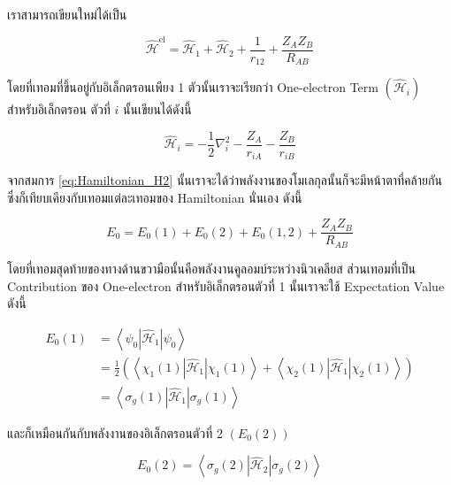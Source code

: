\noindent เราสามารถเขียนใหม่ได้เป็น

\begin{equation}
    \label{eq:Hamiltonian_H2_simple}
    \hat{\mathscr{H}}^{\mathrm{el}}
    =
    \hat{\mathscr{H}}_1
    + \hat{\mathscr{H}}_2
    + \frac{1}{r_{12}}
    + \frac{Z_A Z_B}{R_{A B}}
\end{equation}

\noindent โดยที่เทอมที่ขึ้นอยู่กับอิเล็กตรอนเพียง 1 ตัวนั้นเราจะเรียกว่า One-electron Term $(\hat{\mathscr{H}}_i)$ สำหรับอิเล็กตรอน%
ตัวที่ $i$ นั้นเขียนได้ดังนี้

\begin{equation}
    \hat{\mathscr{H}}_i
    =
    -\frac{1}{2} \nabla_i^2
    -\frac{Z_A}{r_{i A}}
    -\frac{Z_B}{r_{i B}}
\end{equation}

จากสมการ \ref{eq:Hamiltonian_H2} นั้นเราจะได้ว่าพลังงานของโมเลกุลนั้นก็จะมีหน้าตาที่คล้ายกันซึ่งก็เทียบเคียงกับเทอมแต่ละเทอมของ
Hamiltonian นั่นเอง ดังนี้

\begin{equation}
    \label{eq:Energy_hydrogen_molecule}
    E_0 = E_0(1) + E_0(2) + E_0(1,2) + \frac{Z_A Z_B}{R_{A B}}
\end{equation}

\noindent โดยที่เทอมสุดท้ายของทางด้านขวามือนั้นคือพลังงานคูลอมบ์ระหว่างนิวเคลียส ส่วนเทอมที่เป็น Contribution ของ One-electron
สำหรับอิเล็กตรอนตัวที่ 1 นั้นเราจะใช้ Expectation Value ดังนี้

\begin{equation}
    \begin{aligned}
        E_0(1)
         & = \left\langle\psi_0\left|\hat{\mathscr{H}}_1\right| \psi_0\right\rangle \\
         & = \frac{1}{2}
        \left(
        \left\langle
        \chi_1(1)\left|\hat{\mathscr{H}}_1\right| \chi_1(1)
        \right\rangle
        + \left\langle
        \chi_2(1)\left|\hat{\mathscr{H}}_1\right| \chi_2(1)
        \right\rangle
        \right)                                                                     \\
         & = \left\langle
        \sigma_g(1)\left|\hat{\mathscr{H}}_1\right| \sigma_g(1)
        \right\rangle
    \end{aligned}
\end{equation}

\noindent และก็เหมือนกันกับพลังงานของอิเล็กตรอนตัวที่ 2 $(E_0(2))$

\begin{equation}
    E_0(2)
    =
    \left\langle
    \sigma_g(2)
    \left| \hat{\mathscr{H}}_2 \right|
    \sigma_g(2)
    \right\rangle
\end{equation}

